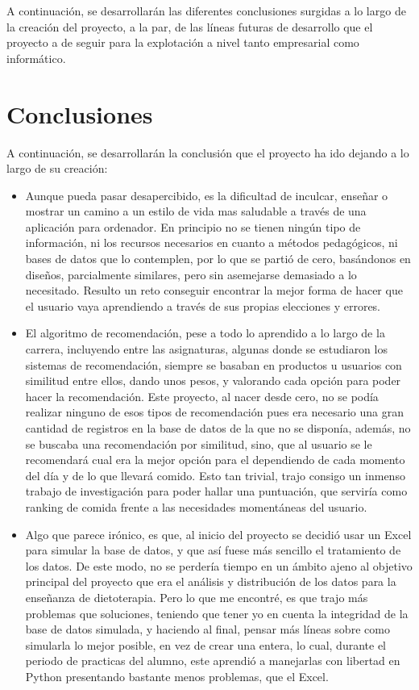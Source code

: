 
A continuación, se desarrollarán las diferentes conclusiones surgidas a lo largo de la creación del proyecto, a la par, de las líneas futuras de desarrollo que el proyecto a de seguir para la explotación a nivel tanto empresarial como informático.
\\
\section{Conclusiones}
A continuación, se desarrollarán la conclusión que el proyecto ha ido dejando a lo largo de su creación:
\begin{itemize}
\item	Aunque pueda pasar desapercibido, es la dificultad de inculcar, enseñar o mostrar un camino a un estilo de vida mas saludable a través de una aplicación para ordenador. En principio no se tienen ningún tipo de información, ni los recursos necesarios en cuanto a métodos pedagógicos, ni bases de datos que lo contemplen, por lo que se partió de cero, basándonos en diseños, parcialmente similares, pero sin asemejarse demasiado a lo necesitado. Resulto un reto conseguir encontrar la mejor forma de hacer que el usuario vaya aprendiendo a través de sus propias elecciones y errores.
\item	El algoritmo de recomendación, pese a todo lo aprendido a lo largo de la carrera, incluyendo entre las asignaturas, algunas donde se estudiaron los sistemas de recomendación, siempre se basaban en productos u usuarios con similitud entre ellos, dando unos pesos, y valorando cada opción para poder hacer la recomendación. Este proyecto, al nacer desde cero, no se podía realizar ninguno de esos tipos de recomendación pues era necesario una gran cantidad de registros en la base de datos de la que no se disponía, además, no se buscaba una recomendación por similitud, sino, que al usuario se le recomendará cual era la mejor opción para el dependiendo de cada momento del día y de lo que llevará comido. Esto tan trivial, trajo consigo un inmenso trabajo de investigación para poder hallar una puntuación, que serviría como ranking de comida frente a las necesidades momentáneas del usuario.
\item	Algo que parece irónico, es que, al inicio del proyecto se decidió usar un Excel para simular la base de datos, y que así fuese más sencillo el tratamiento de los datos. De este modo, no se perdería tiempo en un ámbito ajeno al objetivo principal del proyecto que era el análisis y distribución de los datos para la enseñanza de dietoterapia. Pero lo que me encontré, es que trajo más problemas que soluciones, teniendo que tener yo en cuenta la integridad de la base de datos simulada, y haciendo al final, pensar más líneas sobre como simularla lo mejor posible, en vez de crear una entera, lo cual, durante el periodo de practicas del alumno, este aprendió a manejarlas con libertad en Python presentando bastante menos problemas, que el Excel.

\end{itemize}
